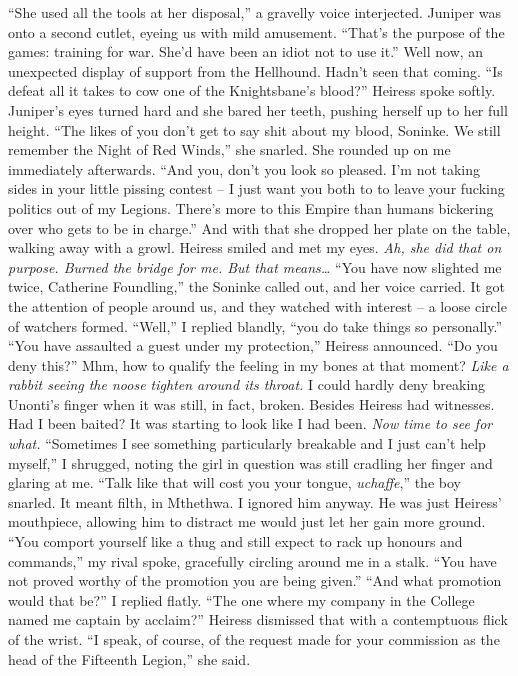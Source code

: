\documentclass[12pt, openany]{book}
\begin{document}
“She used all the tools at her disposal,” a gravelly voice interjected. Juniper was onto a second cutlet, eyeing us with mild amusement. “That’s the purpose of the games: training for war. She’d have been an idiot not to use it.”
Well now, an unexpected display of support from the Hellhound. Hadn’t seen that coming.
“Is defeat all it takes to cow one of the Knightsbane’s blood?” Heiress spoke softly.
Juniper’s eyes turned hard and she bared her teeth, pushing herself up to her full height.
“The likes of you don’t get to say shit about my blood, Soninke. We still remember the Night of Red Winds,” she snarled. She rounded up on me immediately afterwards. “And you, don’t you look so pleased. I’m not taking sides in your little pissing contest – I just want you both to to leave your fucking politics out of my Legions. There’s more to this Empire than humans bickering over who gets to be in charge.”
And with that she dropped her plate on the table, walking away with a growl. Heiress smiled and met my eyes. \textit{Ah, she did that on purpose. Burned the bridge for me. But that means…}
“You have now slighted me twice, Catherine Foundling,” the Soninke called out, and her voice carried.
It got the attention of people around us, and they watched with interest – a loose circle of watchers formed.
“Well,” I replied blandly, “you do take things so personally.”
“You have assaulted a guest under my protection,” Heiress announced. “Do you deny this?”
Mhm, how to qualify the feeling in my bones at that moment? \textit{Like a rabbit seeing the noose tighten around its throat.} I could hardly deny breaking Unonti’s finger when it was still, in fact, broken. Besides Heiress had witnesses. Had I been baited? It was starting to look like I had been. \textit{Now time to see for what.}
“Sometimes I see something particularly breakable and I just can’t help myself,” I shrugged, noting the girl in question was still cradling her finger and glaring at me.
“Talk like that will cost you your tongue, \textit{uchaffe},” the boy snarled.
It meant filth, in Mthethwa. I ignored him anyway. He was just Heiress’ mouthpiece, allowing him to distract me would just let her gain more ground.
“You comport yourself like a thug and still expect to rack up honours and commands,” my rival spoke, gracefully circling around me in a stalk. “You have not proved worthy of the promotion you are being given.”
“And what promotion would that be?” I replied flatly. “The one where my company in the College named me captain by acclaim?”
Heiress dismissed that with a contemptuous flick of the wrist.
“I speak, of course, of the request made for your commission as the head of the Fifteenth Legion,” she said.
\end{document}
